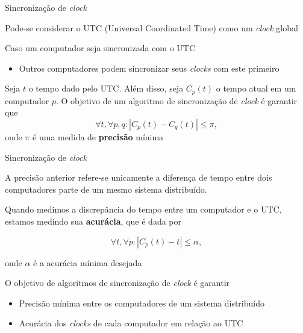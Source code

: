 \documentclass[compress]{beamer}
\begin{document}
\begin{frame}{Sincronização de \textit{clock}}

Pode-se considerar o UTC (Universal Coordinated Time) como um \textit{clock} global

\vspace{0.5cm}

Caso um computador seja sincronizada com o UTC 
\begin{itemize}
    \item Outros computadores podem sincronizar seus \textit{clocks} com este primeiro
\end{itemize}

\vspace{0.5cm}

Seja $t$ o tempo dado pelo UTC. Além disso, seja $C_p(t)$ o tempo atual em um computador $p$. O objetivo de um algoritmo de sincronização de \textit{clock} é garantir que
$$
\forall t, \forall p, q : | C_p(t) - C_q(t) | \leq \pi,
$$
onde $\pi$ é uma medida de \textbf{precisão} mínima
\end{frame}


\begin{frame}{Sincronização de \textit{clock}}

A precisão anterior refere-se unicamente a diferença de tempo entre dois computadores parte de um mesmo sistema distribuído.

\vspace{0.5cm}

Quando medimos a discrepância do tempo entre um computador e o UTC, estamos medindo sua \textbf{acurácia}, que é dada por

$$
\forall t, \forall p: | C_p(t) - t| \leq \alpha,
$$

onde $\alpha$ é a acurácia mínima desejada

\vspace{0.5cm}

O objetivo de algoritmos de sincronização de \textit{clock} é garantir
\begin{itemize}
    \item Precisão mínima entre os computadores de um sistema distribuído
    \item Acurácia dos \textit{clocks} de cada computador em relação ao UTC
\end{itemize}
\end{frame}

\end{document}
